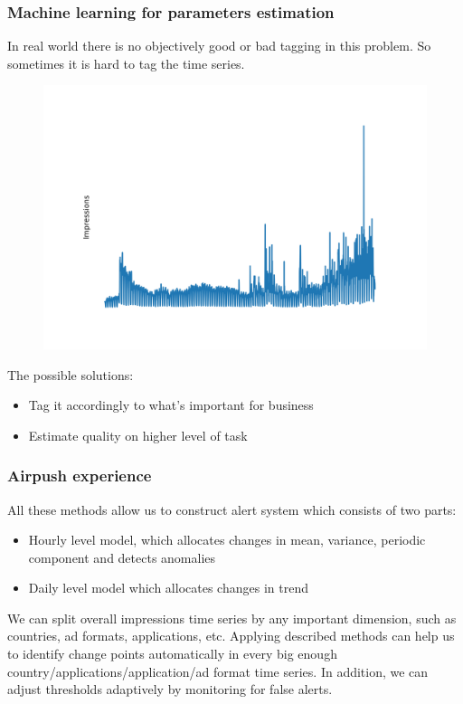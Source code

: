 \documentclass[intlimits, 9pt, unicode]{beamer}
\begin{document}
\begin{frame}
    \frametitle{Machine learning for parameters estimation}

In real world there is no objectively good or bad tagging in this problem. So sometimes it is hard to tag the time series.

\begin{figure}
\includegraphics[scale=0.2]{images/examples_tagging}
\end{figure}

The possible solutions:
	    \begin{itemize}
	    	\item Tag it accordingly to what's important for business
		\item Estimate quality on higher level of task
	    \end{itemize}

 \end{frame}



\begin{frame}
    \frametitle{Airpush experience}
    
All these methods allow us to construct alert system which consists of two parts:

 \begin{itemize}
	    	\item Hourly level model, which allocates changes in mean, variance, periodic component and detects anomalies
		\item Daily level model which allocates changes in trend
\end{itemize}

We can split overall impressions time series by any important dimension, such as countries, ad formats, applications, etc.
Applying described methods can help us to identify change points automatically in every big enough country/applications/application/ad format time series.
\newline
In addition, we can adjust thresholds adaptively by monitoring for false alerts.

\end{frame}
\end{document}
